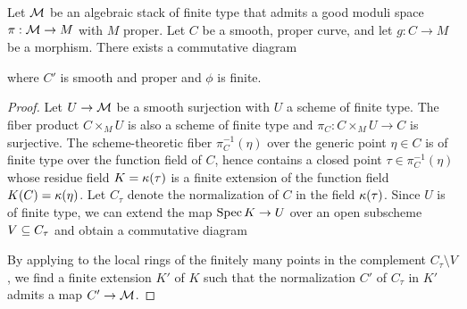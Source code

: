 \begin{lem}\label{finitecurveextension}
    Let $\mathcal{M}$ be an algebraic stack of finite type that admits a good moduli space $\pi: \mathcal{M} \to M$ with $M$ proper. Let $C$ be a smooth, proper curve, and let $g: C \to M$ be a morphism. There exists a commutative diagram
    \begin{center}
    \end{center}
    where $C'$ is smooth and proper and $\phi$ is finite.
\end{lem}
\begin{proof}
    Let $U \to \mathcal{M}$ be a smooth surjection with $U$ a scheme of finite type. The fiber product $C \times_M U$ is also a scheme of finite type and $\pi_C: C \times_M U \to C$ is surjective. The scheme-theoretic fiber $\pi_C^{-1}(\eta)$ over the generic point $\eta \in C$ is of finite type over the function field of $C$, hence contains a closed point $\tau \in \pi_C^{-1}(\eta)$ whose residue field $K = \kappa(\tau)$ is a finite extension of the function field $K(C) = \kappa(\eta)$. Let $C_\tau$ denote the normalization of $C$ in the field $\kappa(\tau)$. Since $U$ is of finite type, we can extend the map $\operatorname{\mathrm{Spec}} K \to U$ over an open subscheme $V \subseteq C_\tau$ and obtain a commutative diagram
    \begin{center}
    \end{center}
    By applying \cite[Theorem A.8]{AHLH} to the local rings of the finitely many points in the complement $C_\tau \setminus V$, we find a finite extension $K'$ of $K$ such that the normalization $C'$ of $C_\tau$ in $K'$ admits a map $C' \to \mathcal{M}$.
\end{proof}

